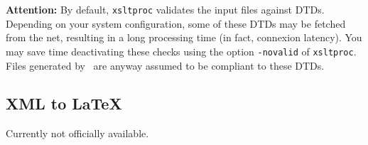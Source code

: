 \smallskip
{\bf Attention:} By default, \verb"xsltproc" validates the input files
against DTDs. Depending on your system configuration, some of these
DTDs may be fetched from the net, resulting in a long processing time
(in fact, connexion latency). You may save time deactivating these
checks using the option \verb"-novalid" of \verb"xsltproc". Files
generated by \focalizec\ are anyway assumed to be compliant to these DTDs.

\subsection{XML to LaTeX}

Currently not officially available.
